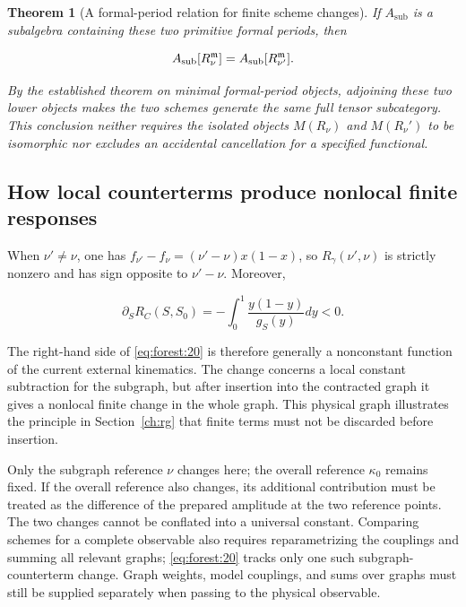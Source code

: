 \documentclass[11pt,a4paper,oneside]{article}
\theoremstyle{plain}
\newtheorem{theorem}{Theorem}[section]
\theoremstyle{definition}
\theoremstyle{remark}
\numberwithin{equation}{section}
\begin{document}
\begin{theorem}[A formal-period relation for finite scheme changes]
If \(A_{\mathrm{sub}}\) is a subalgebra containing these two primitive formal periods, then

\begin{equation}
A_{\rm sub}[R_\nu^{\mathfrak m}]
        =A_{\rm sub}[R_{\nu'}^{\mathfrak m}].                   \label{eq:forest:25}
\end{equation}

By the established theorem on minimal formal-period objects, adjoining these two lower objects makes the two schemes generate the same full tensor subcategory. This conclusion neither requires the isolated objects \(M(R_\nu )\) and \(M(R_\nu ')\) to be isomorphic nor excludes an accidental cancellation for a specified functional.

\end{theorem}


\subsection{How local counterterms produce nonlocal finite responses}\label{sec:forest:7}

When \(\nu '\ne \nu \), one has \(f_{\nu '}- f_\nu =(\nu '- \nu )x(1- x)\), so \(R_\gamma (\nu ',\nu )\) is strictly nonzero and has sign opposite to \(\nu '- \nu \). Moreover,

\begin{equation}
\partial_S R_C(S,S_0)
       =-\int_0^1\frac{y(1-y)}{g_S(y)}dy<0.                    \label{eq:forest:26}
\end{equation}

The right-hand side of \eqref{eq:forest:20} is therefore generally a nonconstant function of the current external kinematics. The change concerns a local constant subtraction for the subgraph, but after insertion into the contracted graph it gives a nonlocal finite change in the whole graph. This physical graph illustrates the principle in Section~\ref{ch:rg} that finite terms must not be discarded before insertion.

Only the subgraph reference \(\nu \) changes here; the overall reference \(\kappa _0\) remains fixed. If the overall reference also changes, its additional contribution must be treated as the difference of the prepared amplitude at the two reference points. The two changes cannot be conflated into a universal constant. Comparing schemes for a complete observable also requires reparametrizing the couplings and summing all relevant graphs; \eqref{eq:forest:20} tracks only one such subgraph-counterterm change. Graph weights, model couplings, and sums over graphs must still be supplied separately when passing to the physical observable.
\end{document}
